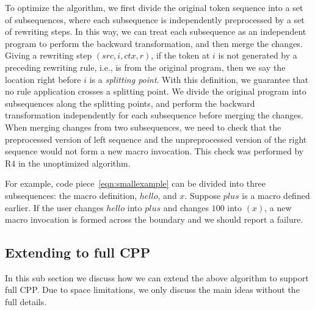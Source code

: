 To optimize the algorithm, we first divide the original
token sequence into a set of subsequences, where each subsequence is
independently preprocessed by a set of rewriting steps. In this way, we
can treat each subsequence as an independent program to perform the
backward transformation, and then merge the changes. Giving a rewriting
step $(src, i, ctx, r)$, if the token at $i$ is not generated by a
preceding rewriting rule, i.e., is from the original program, then we
say the location right before $i$ is a \emph{splitting point}. With
this definition, we guarantee that no rule application crosses a
splitting point. We divide the original program into
subsequences along the splitting points, and perform the backward transformation
independently for each subsequence before merging the changes. %
When merging changes from two subsequences, we need to check that the
preprocessed version of left sequence and the unpreprocessed version of
the right sequence would not form a new macro invocation. This check
was performed by R4 in the unoptimized algorithm.%

For example, code piece~\ref{eqn:smallexample} can be divided into
three subsequences: the macro definition, $hello$, and $x$. Suppose
$plus$ is a macro defined earlier. If the user changes $hello$ into
$plus$ and changes $100$ into $(x)$, a new macro invocation is formed
across the boundary and we should report a failure.


\subsection{Extending to full CPP}\label{sec:fullC}
In this sub section we discuss how we can extend the above algorithm
to support full CPP. Due to space limitations, we
only discuss the main ideas without the full details.

